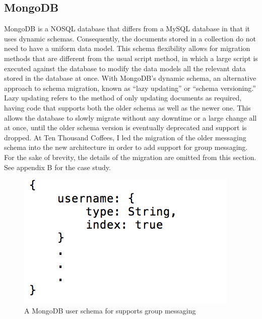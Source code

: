 \documentclass[12pt]{article}
\begin{document}
\subsection{MongoDB}
MongoDB is a NOSQL database that differs from a MySQL database in that it uses dynamic schemas. Consequently, the documents stored in a collection do not need to have a uniform data model. This schema flexibility allows for migration methods that are different from the usual script method, in which a large script is executed against the database to modify the data models all the relevant data stored in the database at once. With MongoDB's dynamic schema, an alternative approach to schema migration, known as ``lazy updating'' or ``schema versioning.'' Lazy updating refers to the method of only updating documents as required, having code that supports both the older schema as well as the newer one. This allows the database to slowly migrate without any downtime or a large change all at once, until the older schema version is eventually deprecated and support is dropped. At Ten Thousand Coffees, I led the migration of the older messaging schema into the new architecture in order to add support for group messaging. For the sake of brevity, the details of the migration are omitted from this section. See appendix B for the case study.

\begin{figure}
\begin{center}
        \includegraphics[scale=0.8]{resources/user_schema.png}
\end{center}
\caption{\label{figcaption} A MongoDB user schema for supports group messaging}
\end{figure}
\end{document}
